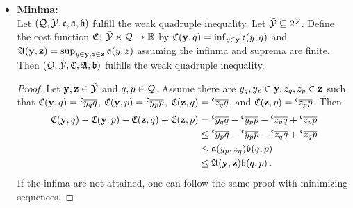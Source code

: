 \begin{itemize}
\begin{equation*}
	\end{equation*}
	also fulfills the quadruple inequality.
	\begin{proof}
		It holds
		\begin{align*}
			&\mf C(y,q) - \mf C( z,q) -\mf C(y,p)+\mf C(z,p)
			\\&= 
			\int \mf c(\omega; y(\omega),q(\omega)) -  \mf c(\omega; y(\omega),p(\omega))\\
			 &\qquad- \mf c(\omega; z(\omega),q(\omega)) + \mf c(\omega; z(\omega),p(\omega))\dl \mu(\omega)
			\\&\leq 
			\int \mf a(\omega; y(\omega),z(\omega)) \mf b(\omega; q(\omega),p(\omega))\dl \mu(\omega)
			\\&\leq 
			\mf A(y,z) \mf B(q, p)
			\eqcm
		\end{align*}
		by Hölder's inequality.
	\end{proof}
\item[]\hspace*{-0.5cm}\textbf{Minima:}\\
	Let $(\mathcal{Q}, \mathcal{Y}, \mathfrak{c}, \mathfrak{a}, \mathfrak{b})$ fulfill the weak quadruple inequality. Let $\tilde{\mathcal{Y}} \subseteq 2^{\mathcal{Y}}$. Define the cost function $\mathfrak{C} \colon \tilde{\mathcal{Y}} \times \mathcal{Q} \to \mathbb{R}$ by $\mathfrak{C}(\mathbf{y}, q) = \inf_{y\in\mathbf{y}} \mathfrak{c}(y,q)$ and
	$\mathfrak{A}(\mathbf{y},\mathbf{z}) = \sup_{y\in\mathbf{y},z\in\mathbf{z}} \mathfrak{a}(y,z)$ assuming the infinma and suprema are finite. Then $(\mathcal{Q}, \tilde{\mathcal{Y}}, \mathfrak{C}, \mathfrak{A}, \mathfrak{b})$ fulfills the weak quadruple inequality.
	\begin{proof}
	Let $\mathbf{y},\mathbf{z}\in \tilde{\mathcal{Y}}$ and  $q ,p\in \mathcal{Q}$.
	Assume there are $y_q, y_p \in \mathbf{y}, z_q, z_p \in \mathbf{z}$ such that $\mf C(\mo y,q) = \olc {y_{q}}{q}$, $\mf C(\mo y,p) = \olc {y_{p}}{p}$, $\mf C(\mo z,q) = \olc {z_{q}}{q}$, and $\mf C(\mo z,p) = \olc {z_{p}}{p}$. Then
	\begin{align*}
		\mf C(\mo y,q) - \mf C(\mo y,p) - \mf C(\mo z,q) + \mf C(\mo z,p)
		&=
		\olc {y_{q}}{q} - \olc {y_{p}}{p} - \olc {z_{q}}{q} + \olc {z_{p}}{p}
		\\&\leq
		\olc {y_{p}}{q} - \olc {y_{p}}{p} - \olc {z_{q}}{q} + \olc {z_{q}}{p}
		\\&\leq
		\mf a(y_{p},z_{q}) \mf b(q, p) 
		\\&\leq
		\mf A(\mo y,\mo z) \mf b(q,p)
		\eqfs
	\end{align*}
	If the infima are not attained, one can follow the same proof with minimizing sequences.
	\end{proof} 

\end{itemize}
